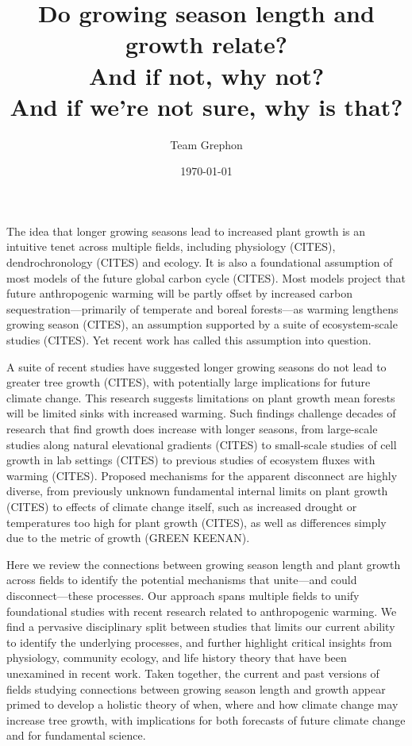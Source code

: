 \documentclass[11pt]{article}
\begin{document}
\renewcommand{\refname}{\CHead{}}


\title{Do growing season length and growth relate? \\ And if not, why not? \\ And if we're not sure, why is that?}
\author{Team Grephon}
\date{\today}
\maketitle

The idea that longer growing seasons lead to increased plant growth is an intuitive tenet across multiple fields, including physiology (CITES), dendrochronology (CITES) and ecology. It is also a foundational assumption of most models of the future global carbon cycle (CITES). Most models project that future anthropogenic warming will be partly offset by increased carbon sequestration---primarily of temperate and boreal forests---as warming lengthens growing season (CITES), an assumption supported by a suite of ecosystem-scale studies (CITES). Yet recent work has called this assumption into question.

A suite of recent studies have suggested longer growing seasons do not lead to greater tree growth (CITES), with potentially large implications for future climate change. This research suggests limitations on plant growth mean forests will be limited sinks with increased warming. Such findings challenge decades of research that find growth does increase with longer seasons, from large-scale studies along natural elevational gradients (CITES) to small-scale studies of cell growth in lab settings (CITES) to previous studies of ecosystem fluxes with warming (CITES). Proposed mechanisms for the apparent disconnect are highly diverse, from previously unknown fundamental internal limits on plant growth (CITES) to effects of climate change itself, such as increased drought or temperatures too high for plant growth (CITES), as well as differences simply due to the metric of growth (GREEN KEENAN).

Here we review the connections between growing season length and plant growth across fields to identify the potential mechanisms that unite---and could disconnect---these processes. Our approach spans multiple fields to unify foundational studies with recent research related to anthropogenic warming. We find a pervasive disciplinary split between studies that limits our current ability to identify the underlying processes, and further highlight critical insights from physiology, community ecology, and life history theory that have been unexamined in recent work. Taken together, the current and past versions of fields studying connections between growing season length and growth appear primed to develop a holistic theory of when, where and how climate change may increase tree growth, with implications for both forecasts of future climate change and for fundamental science.
\end{document}
